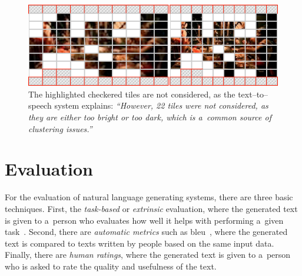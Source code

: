 \documentclass{article}
\begin{document}
\begin{figure}[t!]
  \centering
  \includegraphics[width=0.75\linewidth]{./tile-highlight.png}
  \caption{The highlighted checkered tiles are not considered, as the text--to--speech system explains: \textit{``However, 22 tiles were not considered, as they are either too bright or too dark, which is a~common source of clustering issues.''}}
  \label{fig:tile-highlight}
\end{figure}


\vspace{-0.5cm}
\section{Evaluation}
\label{sec:evaluation}
For the evaluation of natural language generating systems, there are three basic techniques. First, the \emph{task-based} or \emph{extrinsic} evaluation,
where the generated text is given to a~person who evaluates how well it helps with performing a~given task~\cite{portet2009nlg}. Second, there are \emph{automatic metrics} such as {\sc bleu}~\cite{papineni2002bleu}, where the generated text is compared to texts written by people based on the same input data. Finally, there are \emph{human ratings}, where the generated text is given to a~person who is asked to rate the quality and usefulness of the text.
\end{document}
